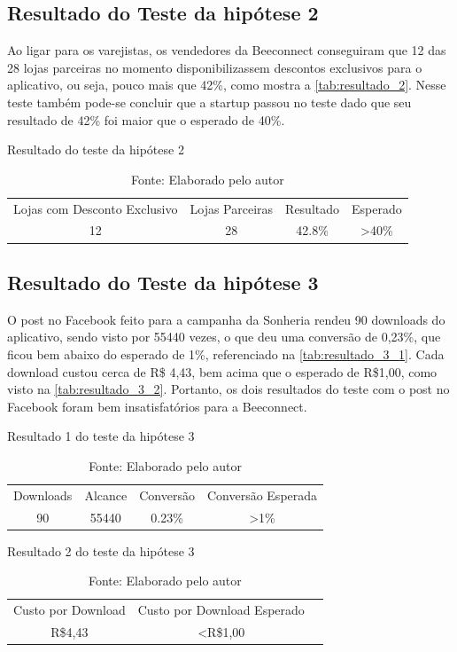 \subsection{Resultado do Teste da hipótese 2}
\label{cha:resultado_2}
Ao ligar para os varejistas, os vendedores da Beeconnect conseguiram que 12 das 28 lojas parceiras no momento disponibilizassem descontos exclusivos para o aplicativo, ou seja, pouco mais que 42\%, como mostra a \autoref{tab:resultado_2}. Nesse teste também pode-se concluir que a startup passou no teste dado que seu resultado de 42\% foi maior que o esperado de 40\%.
\begin{table}[H]
\centering
\caption{Resultado do teste da hipótese 2}
\label{tab:resultado_2}
\begin{tabular}{cccc}
Lojas com Desconto Exclusivo & Lojas Parceiras & Resultado & Esperado          \\
12                       & 28                          & 42.8\%      & \textgreater 40\%
\end{tabular}
\caption* {Fonte: Elaborado pelo autor}    
\end{table}

\subsection{Resultado do Teste da hipótese 3}
\label{cha:resultado_3}
O post no Facebook feito para a campanha da Sonheria rendeu 90 downloads do aplicativo, sendo visto por 55440 vezes, o que deu uma conversão de 0,23\%, que ficou bem abaixo do esperado de 1\%, referenciado na \autoref{tab:resultado_3_1}. Cada download custou cerca de R\$ 4,43, bem acima que o esperado de R\$1,00, como visto na \autoref{tab:resultado_3_2}. Portanto, os dois resultados do teste com o post no Facebook foram bem insatisfatórios para a Beeconnect.
\begin{table}[H]
\centering
\caption{Resultado 1 do teste da hipótese 3}
\label{tab:resultado_3_1}
\begin{tabular}{cccc}
Downloads & Alcance & Conversão & Conversão Esperada \\
90                       & 55440 &  0.23\%     & \textgreater 1\%
\end{tabular}
\caption* {Fonte: Elaborado pelo autor}    
\end{table}

\begin{table}[H]
\centering
\caption{Resultado 2 do teste da hipótese 3}
\label{tab:resultado_3_2}
\begin{tabular}{ccc}
Custo por Download & Custo por Download Esperado \\
R\$4,43          & \textless R\$1,00
\end{tabular}
\caption* {Fonte: Elaborado pelo autor}    
\end{table}


